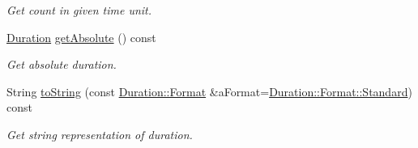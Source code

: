 \begin{DoxyCompactItemize}
\begin{DoxyCompactList}\small\item\em Get count in given time unit. \end{DoxyCompactList}\item 
\hyperlink{classostk_1_1physics_1_1time_1_1_duration}{Duration} \hyperlink{classostk_1_1physics_1_1time_1_1_duration_a99649d50bb22e54f1ba4bd901fe3a7e3}{get\+Absolute} () const
\begin{DoxyCompactList}\small\item\em Get absolute duration. \end{DoxyCompactList}\item 
String \hyperlink{classostk_1_1physics_1_1time_1_1_duration_a20ef00f7f5889c3e815800bb72920482}{to\+String} (const \hyperlink{classostk_1_1physics_1_1time_1_1_duration_a4bf616b67d15e0fbc4beb4fcc306c368}{Duration\+::\+Format} \&a\+Format=\hyperlink{classostk_1_1physics_1_1time_1_1_duration_a4bf616b67d15e0fbc4beb4fcc306c368aeb6d8ae6f20283755b339c0dc273988b}{Duration\+::\+Format\+::\+Standard}) const
\begin{DoxyCompactList}\small\item\em Get string representation of duration. \end{DoxyCompactList}\end{DoxyCompactItemize}
